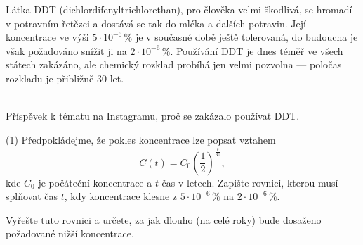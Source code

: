 \documentclass[12pt,a4paper]{article}
\begin{document}
\begin{exercise}

    \begin{minipage}[t]{0.68\textwidth}
        Látka DDT (dichlordifenyltrichlorethan), pro člověka velmi škodlivá, se hromadí 
        v potravním řetězci a dostává se tak do mléka a dalších potravin.
        Její koncentrace ve výši $5 \cdot 10^{-6}\,\%$ je v současné době ještě tolerovaná,
        do budoucna je však požadováno snížit ji na $2 \cdot 10^{-6}\,\%$.
        Používání DDT je dnes téměř ve všech státech zakázáno, ale chemický rozklad probíhá
        jen velmi pozvolna — poločas rozkladu je přibližně $30$ let.
    \end{minipage}
    \hfill
    \begin{minipage}[t]{0.28\textwidth}
        \begin{center}
          \smallskip
            \\[4pt]
            {\small Příspěvek k tématu na Instagramu, proč se zakázalo používat DDT.}
        \end{center}
    \end{minipage}

    \medskip

    \begin{tasks}(1)
        \task Předpokládejme, že pokles koncentrace lze popsat vztahem
        \[
            C(t) = C_0 \left(\frac{1}{2}\right)^{\frac{t}{30}},
        \]
        kde $C_0$ je počáteční koncentrace a $t$ čas v letech.  
        Zapište rovnici, kterou musí splňovat čas $t$, kdy koncentrace klesne z 
        $5 \cdot 10^{-6}\,\%$ na $2 \cdot 10^{-6}\,\%$.

        \task Vyřešte tuto rovnici a určete, za jak dlouho (na celé roky) 
        bude dosaženo požadované nižší koncentrace.
    \end{tasks}
\end{exercise}
\end{document}
